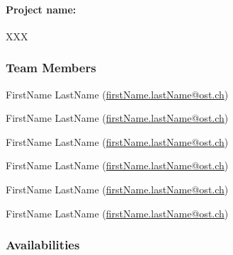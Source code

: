 

\paragraph{Project name:} XXX


\subsubsection*{Team Members}

\begin{compactenum}
    \item FirstName LastName (\href{mailto:firstName.lastName@ost.ch}{firstName.lastName@ost.ch})
    \item FirstName LastName (\href{mailto:firstName.lastName@ost.ch}{firstName.lastName@ost.ch})
    \item FirstName LastName (\href{mailto:firstName.lastName@ost.ch}{firstName.lastName@ost.ch})
    \item FirstName LastName (\href{mailto:firstName.lastName@ost.ch}{firstName.lastName@ost.ch})
    \item FirstName LastName (\href{mailto:firstName.lastName@ost.ch}{firstName.lastName@ost.ch})
    \item FirstName LastName (\href{mailto:firstName.lastName@ost.ch}{firstName.lastName@ost.ch})
\end{compactenum}

\subsubsection*{Availabilities}


